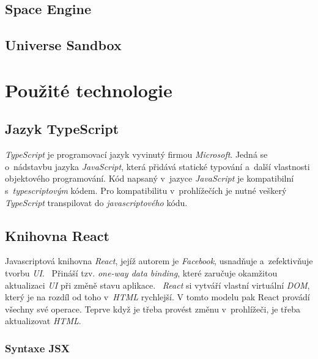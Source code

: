 \documentclass[a4paper,12pt]{article}
\begin{document}

\subsection{Space Engine}
\subsection{Universe Sandbox}


\section{Použité technologie}

\subsection{Jazyk TypeScript}

\textit{TypeScript} je programovací jazyk vyvinutý firmou \textit{Microsoft}. Jedná se o~nádstavbu jazyka \textit{JavaScript}, která přidává statické typování a~další vlastnosti objektového programování. Kód napsaný v~jazyce \textit{JavaScript} je kompatibilní s~\textit{typescriptovým} kódem. Pro kompatibilitu v~prohlížečích je nutné veškerý \textit{TypeScript} transpilovat do \textit{javascriptového} kódu.~\cite{typescript}

\subsection{Knihovna React}

Javascriptová knihovna \textit{React}, jejíž autorem je \textit{Facebook}, usnadňuje a~zefektivňuje tvorbu \textit{UI}.~\cite{react} Přináší tzv. \textit{one-way data binding}, které zaručuje okamžitou aktualizaci \textit{UI} při změně stavu aplikace.~\cite{onewaydatabinding} \textit{React} si vytváří vlastní virtuální \textit{DOM}, který je na rozdíl od toho v~\textit{HTML} rychlejší. V tomto modelu pak React provádí všechny své operace. Teprve když je třeba provést změnu v~prohlížeči, je třeba  aktualizovat \textit{HTML}.~\cite{virtualdom}

\subsubsection{Syntaxe JSX}
\end{document}
